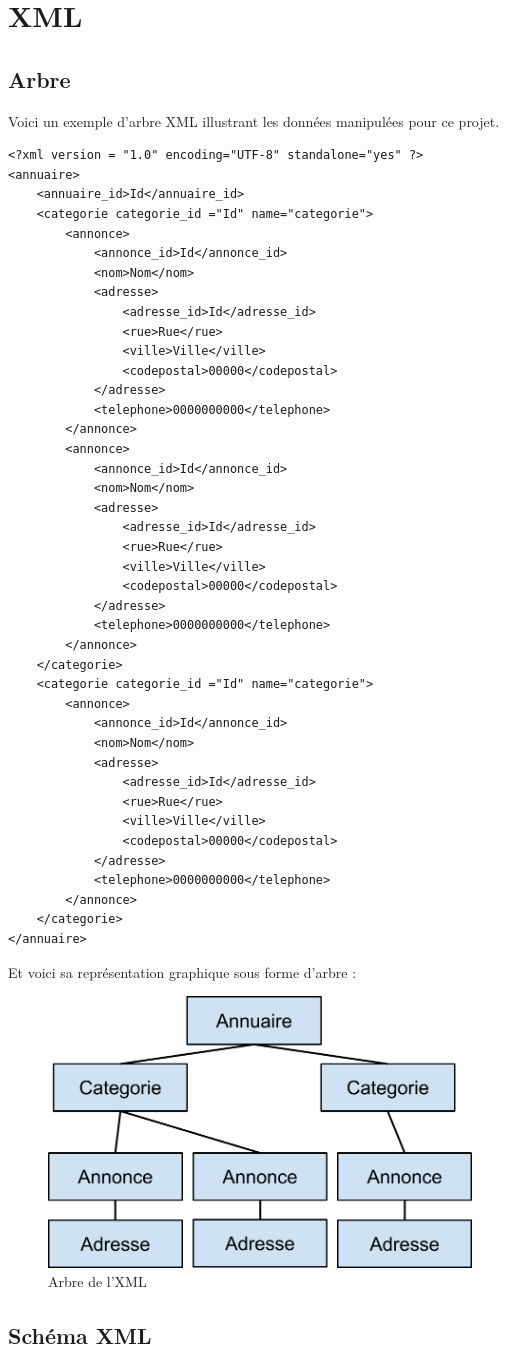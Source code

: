 \chapter{XML}

\section{Arbre}

Voici un exemple d'arbre XML illustrant les données manipulées pour ce projet.

\xml
\begin{lstlisting}
<?xml version = "1.0" encoding="UTF-8" standalone="yes" ?>
<annuaire>
	<annuaire_id>Id</annuaire_id>
	<categorie categorie_id ="Id" name="categorie">
		<annonce>
			<annonce_id>Id</annonce_id>
			<nom>Nom</nom>
			<adresse>
				<adresse_id>Id</adresse_id>
				<rue>Rue</rue>
				<ville>Ville</ville>
				<codepostal>00000</codepostal>
			</adresse>
			<telephone>0000000000</telephone>
		</annonce>
		<annonce>
			<annonce_id>Id</annonce_id>
			<nom>Nom</nom>
			<adresse>
				<adresse_id>Id</adresse_id>
				<rue>Rue</rue>
				<ville>Ville</ville>
				<codepostal>00000</codepostal>
			</adresse>
			<telephone>0000000000</telephone>
		</annonce>
	</categorie>
	<categorie categorie_id ="Id" name="categorie">
		<annonce>
			<annonce_id>Id</annonce_id>
			<nom>Nom</nom>
			<adresse>
				<adresse_id>Id</adresse_id>
				<rue>Rue</rue>
				<ville>Ville</ville>
				<codepostal>00000</codepostal>
			</adresse>
			<telephone>0000000000</telephone>
		</annonce>
	</categorie>
</annuaire>
\end{lstlisting}
Et voici sa représentation graphique sous forme d'arbre :
\begin{figure}[H]
    \centering\includegraphics[width=.7\textwidth]{images/arbre.png}
    \caption{Arbre de l'XML}
\end{figure}

\section{Schéma XML}


